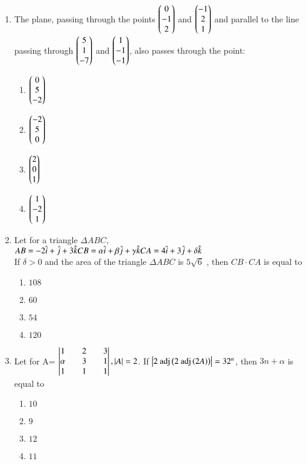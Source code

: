 \documentclass[journal]{IEEEtran}
\theoremstyle{remark}
\begin{document}
\begin{enumerate}
\item The plane, passing through the points $\begin{pmatrix}0\\ -1\\ 2\end{pmatrix}$ and $\begin{pmatrix}-1\\ 2\\ 1\end{pmatrix}$ and parallel to the line passing through $\begin{pmatrix}5\\1\\-7\end{pmatrix}$ and $\begin{pmatrix}1\\-1\\-1\end{pmatrix}$, also passes through the point:

\begin{multicols}{4}
\begin{enumerate}
\item $\begin{pmatrix}0\\5\\-2\end{pmatrix}$
\item $\begin{pmatrix}-2\\5\\0\end{pmatrix}$
\item $\begin{pmatrix}2\\0\\1\end{pmatrix}$
\item $\begin{pmatrix}1\\-2\\1\end{pmatrix}$
\end{enumerate}
\end{multicols}

\item Let for a triangle $\Delta ABC$,\\
$AB= -2\hat{i} +\hat{j} +3\hat{k} \\
CB= \alpha \hat{i} +\beta \hat{j} +\gamma \hat{k}\\
CA= 4\hat{i} +3\hat{j} +\delta \hat{k}$\\
If $\delta >0$ and the area of the triangle $\Delta ABC$ is $5\sqrt{6}$ , then $CB \cdot CA $ is equal to

\begin{multicols}{4}
\begin{enumerate}
\item $108$
\item $60$
\item $54$
\item $120$
\end{enumerate}
\end{multicols}

\item Let for A= $\begin{vmatrix} 1&&2&&3\\\alpha&&3 &&1\\1&&1&&1\end{vmatrix} , \left\vert A\right\vert=2$. If
$\left\vert2\text{ adj}\left(2\text{ adj}\left(2A\right)\right)\right\vert=32^n$, then $3n+\alpha$ is equal to
\begin{multicols}{4}
\begin{enumerate}
\item $10$
\item $9$
\item $12$
\item $11$
\end{enumerate}
\end{multicols}


\end{enumerate}
\end{document}

